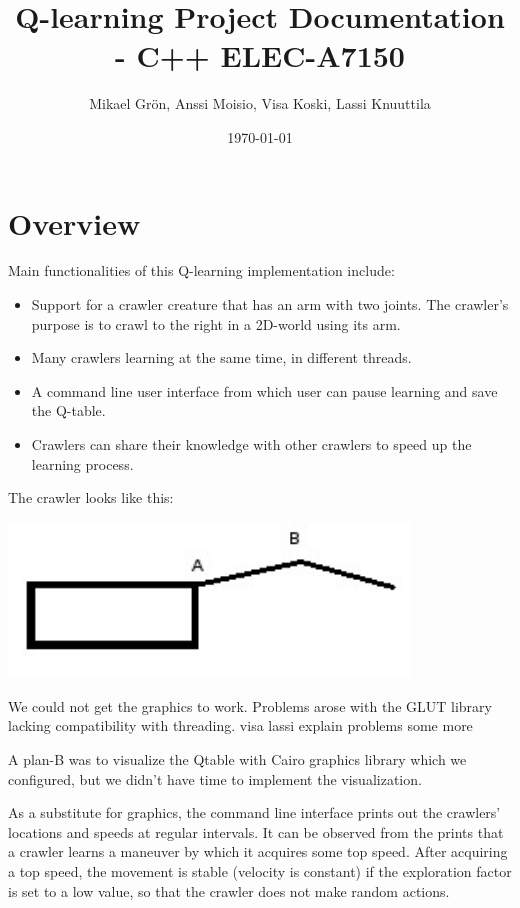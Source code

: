 \documentclass{article}
\author{Mikael Grön, Anssi Moisio, Visa Koski, Lassi Knuuttila}
\title{Q-learning Project Documentation - C++ ELEC-A7150}
\date{\today}
\begin{document}
\maketitle

\tableofcontents
\newpage

\section{Overview}

Main functionalities of this Q-learning implementation include:
\begin{itemize}
  \item Support for a crawler creature that has an arm with two joints. The
  crawler's purpose is to crawl to the right in a 2D-world using its arm.
  \item Many crawlers learning at the same time, in different threads.
  \item A command line user interface from which user can pause learning and
  save the Q-table.
  \item Crawlers can share their knowledge with other crawlers to speed up
  the learning process.
\end{itemize}

The crawler looks like this:

\includegraphics[width=0.8\textwidth]{simple_agent}

We could not get the graphics to work. Problems arose with
the GLUT library lacking compatibility with threading.
visa lassi explain problems some more



A plan-B was to visualize the Qtable with Cairo graphics library which we
configured, but we didn't have time to implement the visualization.

As a substitute for graphics, the command line interface prints out the
crawlers’ locations and speeds at regular intervals. It can be observed
from the prints that a crawler learns a maneuver by which it acquires some
top speed. After acquiring a top speed, the movement is stable (velocity is
constant) if the exploration factor is set to a low value, so that the crawler
does not make random actions.
\end{document}
